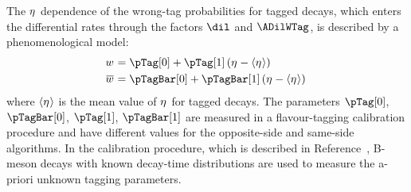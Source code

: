The $\eta^{}$ dependence of the wrong-tag probabilities for tagged decays, which enters the differential rates through the factors $\dil$
and $\ADilWTag$, is described by a phenomenological model:
\begin{subequations}
  \begin{align}
    \wTag    &= \pTag[0]    + \pTag[1]\,    (\etaTag-\langle\etaTag\rangle) \\
    \wTagBar &= \pTagBar[0] + \pTagBar[1]\, (\etaTag-\langle\etaTag\rangle) \,
  \end{align}
\end{subequations}
where $\langle\eta^{}\rangle$ is the mean value of $\eta^{}$ for tagged decays. The parameters $\pTag[0]$, $\pTagBar[0]$, $\pTag[1]$,
$\pTagBar[1]$ are measured in a flavour-tagging calibration procedure and have different values for the opposite-side and same-side
algorithms. In the calibration procedure, which is described in Reference~\cite{LHCb-ANA-2014-039}, B-meson decays with known decay-time
distributions are used to measure the a-priori unknown tagging parameters. 

